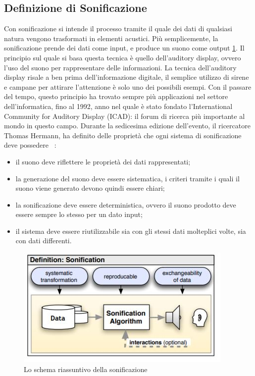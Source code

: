 \subsection{Definizione di Sonificazione}
Con sonificazione si intende il processo tramite il quale dei dati di qualsiasi natura vengono trasformati in elementi acustici.
Più semplicemente, la sonificazione prende dei dati come input, e produce un suono come output \ref{fig:sonification_scheme}.
Il principio sul quale si basa questa tecnica è quello dell'auditory display, ovvero l'uso del suono per rappresentare delle informazioni.
La tecnica dell'auditory display risale a ben prima dell'informazione digitale, il semplice utilizzo di sirene e campane per attirare l'attenzione è solo uno dei possibili esempi.
Con il passare del tempo, questo principio ha trovato sempre più applicazioni nel settore dell'informatica, fino al 1992, anno nel quale è stato fondato l'International Community for Auditory Display (ICAD): il forum di ricerca più importante al mondo in questo campo.
Durante la sedicesima edizione dell'evento, il ricercatore Thomas Hermann, ha definito delle proprietà che ogni sistema di sonificazione deve possedere ~\cite{hermann}:
\begin{itemize}
  \item{il suono deve riflettere le proprietà dei dati rappresentati;}
  \item{la generazione del suono deve essere sistematica, i criteri tramite i quali il suono viene generato devono quindi essere chiari;}
  \item{la sonificazione deve essere deterministica, ovvero il suono prodotto deve essere sempre lo stesso per un dato input;}
  \item{il sistema deve essere riutilizzabile sia con gli stessi dati molteplici volte, sia con dati differenti.}
\end{itemize}
\begin{figure}[H]
  \includegraphics[width=\linewidth,scale=0.5]{img/schema.png}
  \caption{Lo schema riassuntivo della sonificazione}
  \label{fig:sonification_scheme}
\end{figure}


